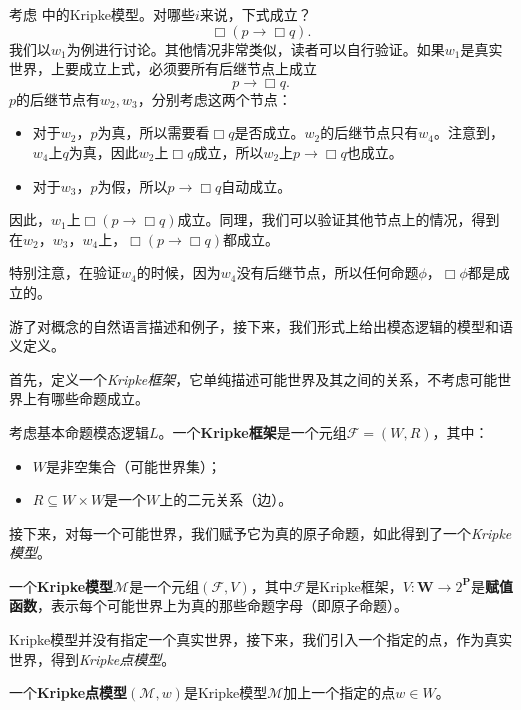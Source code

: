 \begin{example}\label{ex:kripke-model-basic}
考虑 中的Kripke模型。对哪些$i$来说，下式成立？
\[\Box (p\to\Box q).\]
我们以$w_1$为例进行讨论。其他情况非常类似，读者可以自行验证。如果$w_1$是真实世界，上要成立上式，必须要所有后继节点上成立
    \[p\to\Box q.\]
$p$的后继节点有$w_2,w_3$，分别考虑这两个节点：
\begin{itemize}
    \item 对于$w_2$，$p$为真，所以需要看$\Box q$是否成立。$w_2$的后继节点只有$w_4$。注意到，$w_4$上$q$为真，因此$w_2$上$\Box q$成立，所以$w_2$上$p\to\Box q$也成立。
    \item 对于$w_3$，$p$为假，所以$p\to\Box q$自动成立。
\end{itemize}
因此，$w_1$上$\Box (p\to\Box q)$成立。同理，我们可以验证其他节点上的情况，得到在$w_2$，$w_3$，$w_4$上，$\Box (p\to\Box q)$都成立。

特别注意，在验证$w_4$的时候，因为$w_4$没有后继节点，所以任何命题$\phi$，$\Box\phi$都是成立的。
\end{example}

游了对概念的自然语言描述和例子，接下来，我们形式上给出模态逻辑的模型和语义定义。

首先，定义一个\emph{Kripke框架}，它单纯描述可能世界及其之间的关系，不考虑可能世界上有哪些命题成立。

\begin{definition}[Kripke框架]
考虑基本命题模态逻辑$L$。一个\textbf{Kripke框架}是一个元组$\mathcal F=(W,R)$，其中：
\begin{itemize}
\item $W$是非空集合（可能世界集）；
\item $R\subseteq W\times W$是一个$W$上的二元关系（边）。
\end{itemize}
\end{definition}

接下来，对每一个可能世界，我们赋予它为真的原子命题，如此得到了一个\emph{Kripke模型}。

\begin{definition}[Kripke模型]
一个\textbf{Kripke模型}$\mathcal{M}$是一个元组$(\mathcal F,V)$，其中$\mathcal F$是Kripke框架，$V:\mathbf W\to 2^{\mathbf P}$是\textbf{赋值函数}，表示每个可能世界上为真的那些命题字母（即原子命题）。
\end{definition}

Kripke模型并没有指定一个真实世界，接下来，我们引入一个指定的点，作为真实世界，得到\emph{Kripke点模型}。

\begin{definition}[Kripke点模型]
一个\textbf{Kripke点模型}$(\mathcal{M},w)$是Kripke模型$\mathcal M$加上一个指定的点$w\in W$。
\end{definition}

